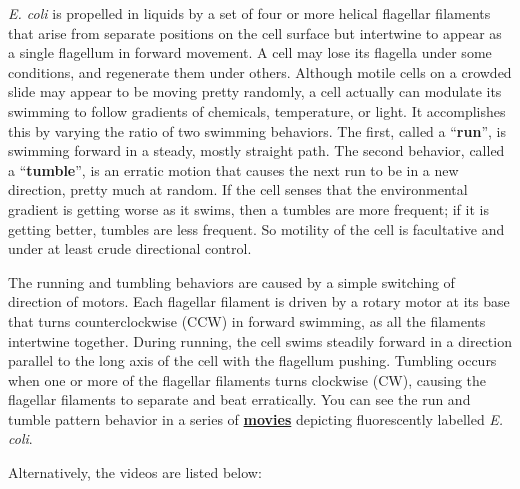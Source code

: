 \documentclass{../lab}
\begin{document}
\emph{E. coli} is propelled in liquids by a set of four or more helical flagellar filaments that arise from separate positions on the cell surface but intertwine to appear as a single flagellum in forward movement. A cell may lose its flagella under some conditions, and regenerate them under others. Although motile cells on a crowded slide may appear to be moving pretty randomly, a cell actually can modulate its swimming to follow gradients of chemicals, temperature, or light. It accomplishes this by varying the ratio of two swimming behaviors. The first, called a ``\textbf{run}'', is swimming forward in a steady, mostly straight path. The second behavior, called a ``\textbf{tumble}'', is an erratic motion that causes the next run to be in a new direction, pretty much at random. If the cell senses that the environmental gradient is getting worse as it swims, then a tumbles are more frequent; if it is getting better, tumbles are less frequent. So motility of the cell is facultative and under at least crude directional control.

The running and tumbling behaviors are caused by a simple switching of direction of motors. Each flagellar filament is driven by a rotary motor at its base that turns counterclockwise (CCW) in forward swimming, as all the filaments intertwine together. During running, the cell swims steadily forward in a direction parallel to the long axis of the cell with the flagellum pushing. Tumbling occurs when one or more of the flagellar filaments turns clockwise (CW), causing the flagellar filaments to separate and beat erratically. You can see the run and tumble pattern behavior in a series of \href{http://www.rowland.harvard.edu/labs/bacteria/movies/ecoli.php}{\textbf{movies}} depicting fluorescently labelled \emph{E. coli}.

Alternatively, the videos are listed below:
\end{document}
